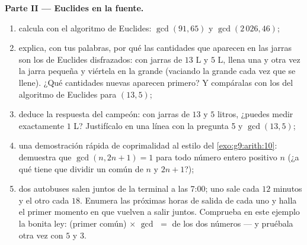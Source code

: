 \begin{problem}
\medskip
\noindent\textbf{Parte II --- Euclides en la fuente.}
\begin{enumerate}[resume]
  \item calcula con el algoritmo de Euclides: $\gcd(91, 65)$ y
        $\gcd(2\,026, 46)$;
  \item explica, con tus palabras, por qué las cantidades que aparecen en
        las jarras son los  de Euclides disfrazados: con jarras
        de $13$ L y $5$ L, llena una y otra vez la jarra pequeña y
        viértela en la grande (vaciando la grande cada vez que
        se llene). ¿Qué cantidades nuevas aparecen primero? Y
        compáralas con los  del algoritmo de Euclides
        para $(13, 5)$;
  \item deduce la respuesta del campeón: con jarras de $13$ y $5$
        litros, ¿puedes medir exactamente $1$ L? Justifícalo en una
        línea con la pregunta 5 y $\gcd(13, 5)$;
  \item una demostración rápida de coprimalidad al estilo del
        \cref{exo:g9:arith:10}: demuestra que $\gcd(n, 2n + 1) = 1$
        para todo número entero positivo $n$ (¿a qué tiene que dividir un
         común de $n$ y $2n + 1$?);
  \item dos autobuses salen juntos de la terminal a las 7:00; uno
        sale cada $12$ minutos y el otro cada $18$. Enumera
        las próximas horas de salida de cada uno y halla el primer
        momento en que vuelven a salir juntos. Comprueba en este ejemplo
        la bonita ley: (primer  común) $\times$
        $\gcd$ $=$  de los dos números --- y pruébala
        otra vez con $5$ y $3$.
\end{enumerate}


\end{problem}
